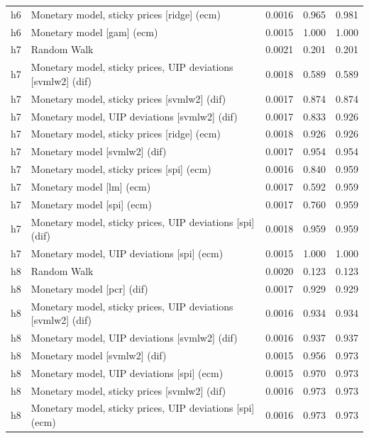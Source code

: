 \begin{ThreePartTable}
\begin{longtable}[t]{cp{5.5cm}ccc}
h6 & \raggedright Monetary model, sticky prices [ridge] (ecm) & 0.0016 & 0.965 & 0.981\\
h6 & \raggedright Monetary model [gam] (ecm) & 0.0015 & 1.000 & 1.000\\
\addlinespace
h7 & \raggedright Random Walk & 0.0021 & 0.201 & 0.201\\
h7 & \raggedright Monetary model, sticky prices, UIP deviations [svmlw2] (dif) & 0.0018 & 0.589 & 0.589\\
h7 & \raggedright Monetary model, sticky prices [svmlw2] (dif) & 0.0017 & 0.874 & 0.874\\
h7 & \raggedright Monetary model, UIP deviations [svmlw2] (dif) & 0.0017 & 0.833 & 0.926\\
h7 & \raggedright Monetary model, sticky prices [ridge] (ecm) & 0.0018 & 0.926 & 0.926\\
h7 & \raggedright Monetary model [svmlw2] (dif) & 0.0017 & 0.954 & 0.954\\
h7 & \raggedright Monetary model, sticky prices [spi] (ecm) & 0.0016 & 0.840 & 0.959\\
h7 & \raggedright Monetary model [lm] (ecm) & 0.0017 & 0.592 & 0.959\\
h7 & \raggedright Monetary model [spi] (ecm) & 0.0017 & 0.760 & 0.959\\
h7 & \raggedright Monetary model, sticky prices, UIP deviations [spi] (dif) & 0.0018 & 0.959 & 0.959\\
h7 & \raggedright Monetary model, UIP deviations [spi] (ecm) & 0.0015 & 1.000 & 1.000\\
\addlinespace
h8 & \raggedright Random Walk & 0.0020 & 0.123 & 0.123\\
h8 & \raggedright Monetary model [pcr] (dif) & 0.0017 & 0.929 & 0.929\\
h8 & \raggedright Monetary model, sticky prices, UIP deviations [svmlw2] (dif) & 0.0016 & 0.934 & 0.934\\
h8 & \raggedright Monetary model, UIP deviations [svmlw2] (dif) & 0.0016 & 0.937 & 0.937\\
h8 & \raggedright Monetary model [svmlw2] (dif) & 0.0015 & 0.956 & 0.973\\
h8 & \raggedright Monetary model, UIP deviations [spi] (ecm) & 0.0015 & 0.970 & 0.973\\
h8 & \raggedright Monetary model, sticky prices [svmlw2] (dif) & 0.0016 & 0.973 & 0.973\\
h8 & \raggedright Monetary model, sticky prices, UIP deviations [spi] (ecm) & 0.0016 & 0.973 & 0.973\\

\end{longtable}
\end{ThreePartTable}
